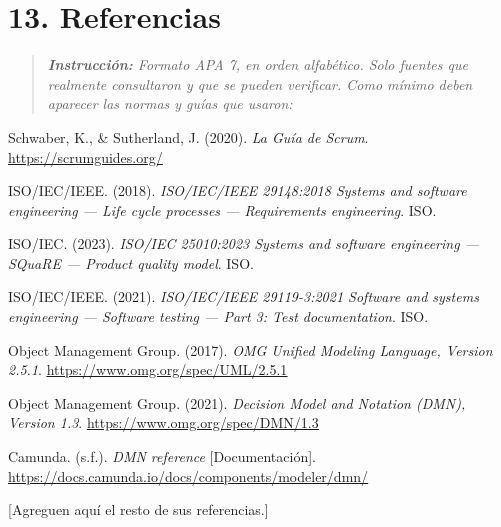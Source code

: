 \section{13. Referencias}\label{referencias}

\begin{quote}
\emph{\textbf{Instrucción:} Formato APA 7, en orden alfabético. Solo
fuentes que realmente consultaron y que se pueden verificar. Como mínimo
deben aparecer las normas y guías que usaron:}
\end{quote}

Schwaber, K., \& Sutherland, J. (2020). \emph{La Guía de Scrum}.
\href{https://scrumguides.org/}{\ul{https://scrumguides.org/}}

ISO/IEC/IEEE. (2018). \emph{ISO/IEC/IEEE 29148:2018 Systems and software
engineering --- Life cycle processes --- Requirements engineering}. ISO.

ISO/IEC. (2023). \emph{ISO/IEC 25010:2023 Systems and software
engineering --- SQuaRE --- Product quality model}. ISO.

ISO/IEC/IEEE. (2021). \emph{ISO/IEC/IEEE 29119-3:2021 Software and
systems engineering --- Software testing --- Part 3: Test
documentation}. ISO.

Object Management Group. (2017). \emph{OMG Unified Modeling Language,
Version 2.5.1}.
\href{https://www.omg.org/spec/UML/2.5.1}{\ul{https://www.omg.org/spec/UML/2.5.1}}

Object Management Group. (2021). \emph{Decision Model and Notation (DMN),
Version 1.3}.
\href{https://www.omg.org/spec/DMN/1.3}{\ul{https://www.omg.org/spec/DMN/1.3}}

Camunda. (s.f.). \emph{DMN reference} [Documentación].
\href{https://docs.camunda.io/docs/components/modeler/dmn/}{\ul{https://docs.camunda.io/docs/components/modeler/dmn/}}

{[}Agreguen aquí el resto de sus referencias.{]}
